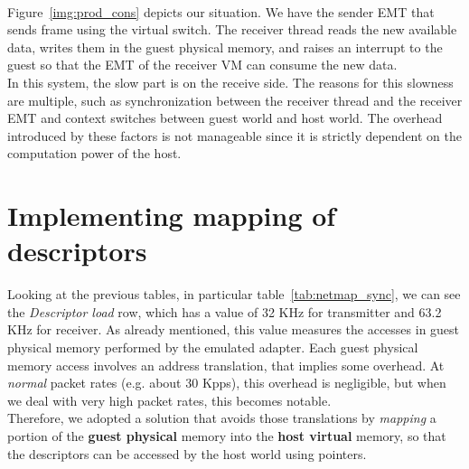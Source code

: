 \documentclass[a4paper, 12pt, titlepage]{report}
\begin{document}
\\
Figure~\ref{img:prod_cons} depicts our situation. We have the sender EMT that sends frame using the virtual switch. The receiver thread reads the new available data, writes them in the guest physical memory, and raises an interrupt to the guest so that the EMT of the receiver VM can consume the new data.
\\
In this system, the slow part is on the receive side. The reasons for this slowness are multiple, such as synchronization between the receiver thread and the receiver EMT and context switches between guest world and host world. The overhead introduced by these factors is not manageable since it is strictly dependent on the computation power of the host.

\section{Implementing mapping of descriptors} \label{subsec:memmap}
Looking at the previous tables, in particular table~\ref{tab:netmap_sync}, we can see the \textit{Descriptor load} row, which has a value of 32 KHz for transmitter and 63.2 KHz for receiver. As already mentioned, this value measures the accesses in guest physical memory performed by the emulated adapter. Each guest physical memory access involves an address translation, that implies some overhead. At \textit{normal} packet rates (e.g. about 30 Kpps), this overhead is negligible, but when we deal with very high packet rates, this becomes notable.
\\
Therefore, we adopted a solution that avoids those translations by \textit{mapping} a portion of the \textbf{guest physical} memory into the \textbf{host virtual} memory, so that the descriptors can be accessed by the host world using pointers.
\end{document}
